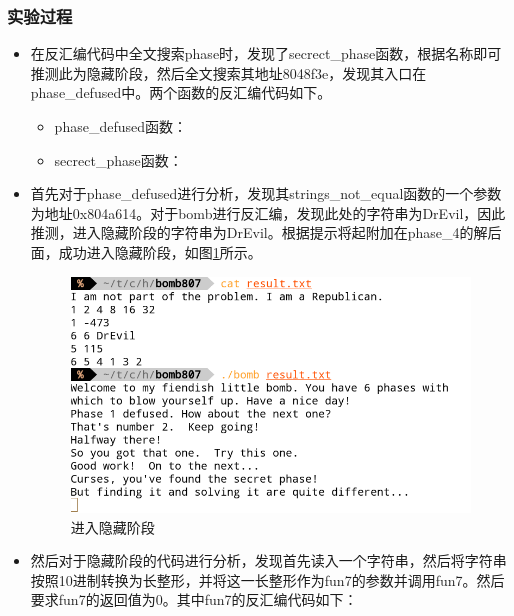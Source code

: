 \subsubsection{实验过程}
\begin{itemize}
	\item 在反汇编代码中全文搜索phase时，发现了secrect\_phase函数，根据名称即可推测此为隐藏阶段，然后全文搜索其地址8048f3e，发现其入口在phase\_defused中。两个函数的反汇编代码如下。
		\begin{itemize}
			\item phase\_defused函数：
				\begin{codeFont}
					
				\end{codeFont}
			\item secrect\_phase函数：
				\begin{codeFont}
					
				\end{codeFont}
		\end{itemize}
	\item 首先对于phase\_defused进行分析，发现其strings\_not\_equal函数的一个参数为地址0x804a614。对于bomb进行反汇编，发现此处的字符串为DrEvil，因此推测，进入隐藏阶段的字符串为DrEvil。根据提示将起附加在phase\_4的解后面，成功进入隐藏阶段，如图\ref{fig:fig14}所示。
		\begin{figure}[H]
			\centering
			\includegraphics[width=0.95\linewidth]{resources/fig14.png}
			\caption{进入隐藏阶段}
			\label{fig:fig14}
		\end{figure}
	\item 然后对于隐藏阶段的代码进行分析，发现首先读入一个字符串，然后将字符串按照10进制转换为长整形，并将这一长整形作为fun7的参数并调用fun7。然后要求fun7的返回值为0。其中fun7的反汇编代码如下：
		\begin{codeFont}
			

\end{codeFont}
\end{itemize}

